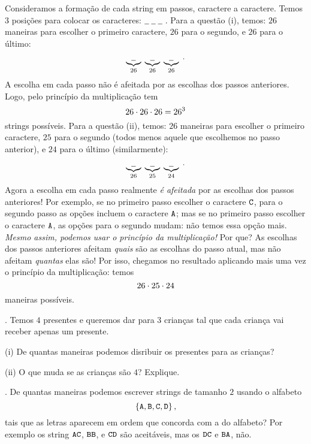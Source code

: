 \solution
Consideramos a formação de cada string em passos, caractere a caractere.
Temos 3 posições para colocar os caracteres:
$
\underline{\phantom{\txt Z}}
\;
\underline{\phantom{\txt Z}}
\;
\underline{\phantom{\txt Z}}
\;
$.
\endgraf
Para a questão (i), temos:
$26$ maneiras para escolher o primeiro caractere,
$26$ para o segundo, e
$26$ para o último:
$$
\underbrace{
\underline{\phantom{\txt Z}}
}_{26}
\;
\underbrace{
\underline{\phantom{\txt Z}}
}_{26}
\;
\underbrace{
\underline{\phantom{\txt Z}}
}_{26}
\;.
$$
A escolha em cada passo não é afeitada por as escolhas dos passos anteriores.
Logo, pelo princípio da multiplicação tem
$$
26\mathbin{\cdot} 26\mathbin{\cdot} 26 = 26^3
$$
strings possíveis.
\endgraf
Para a questão (ii), temos:
$26$ maneiras para escolher o primeiro caractere,
$25$ para o segundo (todos menos aquele que escolhemos no passo anterior), e
$24$ para o último (similarmente):
$$
\underbrace{
\underline{\phantom{\txt Z}}
}_{26}
\;
\underbrace{
\underline{\phantom{\txt Z}}
}_{25}
\;
\underbrace{
\underline{\phantom{\txt Z}}
}_{24}
\;.
$$
Agora a escolha em cada passo realmente \emph{é afeitada} por as escolhas
dos passos anteriores!
Por exemplo, se no primeiro passo escolher o caractere $\text{\tt C}$, para
o segundo passo as opções incluem o caractere $\text{\tt A}$; 
mas se no primeiro passo escolher o caractere $\text{\tt A}$, as opções para o segundo
mudam: não temos essa opção mais.
\emph{Mesmo assim, podemos usar o princípio da multiplicação!}
Por que?
As escolhas dos passos anteriores afeitam \emph{quais} são as escolhas do passo atual,
mas não afeitam \emph{quantas} elas são!
Por isso, chegamos no resultado aplicando mais uma vez o princípio da multiplicação:
temos
$$
26\mathbin{\cdot} 25\mathbin{\cdot} 24
$$
maneiras possíveis.
\endexample

\exercise.
Temos $4$ presentes e queremos dar para $3$ crianças tal que cada criança vai
receber apenas um presente.
\item{(i)} De quantas maneiras podemos disribuir os presentes para as crianças?
\item{(ii)} O que muda se as crianças são $4$?  Explique.

\endexercise

\exercise.
De quantas maneiras podemos escrever strings de tamanho $2$ usando o alfabeto
$$
\left\{\text{\tt A}, \text{\tt B}, \text{\tt C}, \text{\tt D}\right\},
$$
tais que as letras aparecem em ordem que concorda com a do alfabeto?
Por exemplo os string $\text{\tt A} \text{\tt C}$, $\text{\tt B} \text{\tt B}$, e $\text{\tt C} \text{\tt D}$ são aceitáveis,
mas os $\text{\tt D} \text{\tt C}$ e $\text{\tt B} \text{\tt A}$, não.

